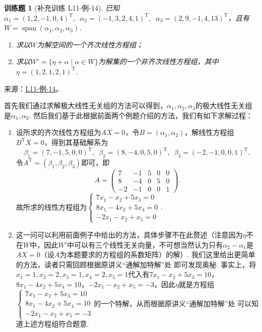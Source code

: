 \documentclass[UTF8,12pt,a4paper,fontset=fandol]{ctexart}
\newtheorem{exercise}{训练题}[section]
\begin{document}
\begin{exercise}[补充训练 L11-例-14]\label{prob:L11-例-14}
已知$\alpha_1=(1,2,-1,0,4)^\mathrm{T},\enspace\alpha_2=(-1,3,2,4,1)^\mathrm{T},\enspace\alpha_3=(2,9,-1,4,13)^\mathrm{T}$，且有$W=\operatorname{span}(\alpha_1,\alpha_2,\alpha_3)$.
    \begin{enumerate}
        \item 求以$W$为解空间的一个齐次线性方程组；

        \item 求以$W'=\{\eta+\alpha \mid \alpha\in W\}$为解集的一个非齐次线性方程组，其中$\eta=(1,2,1,2,1)^\mathrm{T}$.
    \end{enumerate}
\end{exercise}
\noindent 来源：\href{https://github.com/yhwu-is/Linear-Algebra-Left-Undone/blob/new/%E8%AE%B2%E4%B9%89/%E4%B8%93%E9%A2%98/11%20%E6%9C%9D%E8%8A%B1%E5%A4%95%E6%8B%BE.tex}{L11-例-14}。
\begin{solve}
首先我们通过求解极大线性无关组的方法可以得到，$\alpha_1,\alpha_2,\alpha_3$的极大线性无关组是$\alpha_1,\alpha_2$. 然后我们基于此根据前面两个例题介绍的方法，我们有如下求解过程：
    \begin{enumerate}
        \item 设所求的齐次线性方程组为$AX=0$，令$B=(\alpha_1,\alpha_2)$，解线性方程组$B^\mathrm{T}X=0$，得到其基础解系为
              \[\beta_1=(7,-1,5,0,0)^\mathrm{T},\enspace\beta_2=(8,-4,0,5,0)^\mathrm{T},\enspace\beta_3=(-2,-1,0,0,1)^\mathrm{T},\]
              令$A^\mathrm{T}=(\beta_1,\beta_2,\beta_3)$即可，即
              \[A=\begin{pmatrix}
                      7 & -1 & 5 & 0 & 0 \\ 8 & -4 & 0 & 5 & 0 \\ -2 & -1 & 0 & 0 & 1
                  \end{pmatrix}.\]
              故所求的线性方程组为$\begin{cases}
                      7x_1-x_2+5x_3=0 \\ 8x_1-4x_2+5x_4=0 \\ -2x_1-x_2+x_5=0
                  \end{cases}$.

        \item 这一问可以利用前面例子中给出的方法，具体步骤不在此赘述（注意因为$\eta$不在$W$中，因此$W'$中可以有三个线性无关向量，不可想当然认为只有$\alpha_2-\alpha_1$是$AX=0$（设$A$为本题要求的方程组的系数矩阵）的解）. 我们这里给出更简单的方法，读者只需回顾根据原讲义“通解加特解”处 即可发现奥秘. 事实上，将$x_1=1,x_2=2,x_3=1,x_4=2,x_5=1$代入有$7x_1-x_2+5x_3=10$，$8x_1-4x_2+5x_4=10$，$-2x_1-x_2+x_5=-3$，因此$\eta$就是方程组$\begin{cases}
                      7x_1-x_2+5x_3=10 \\ 8x_1-4x_2+5x_4=10 \\ -2x_1-x_2+x_5=-3
                  \end{cases}$的一个特解，从而根据原讲义“通解加特解”处 可以知道上述方程组符合题意.
    \end{enumerate}
\end{solve}
\end{document}
